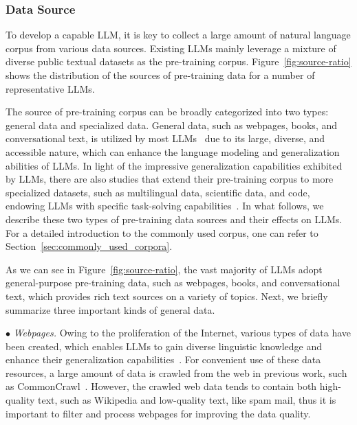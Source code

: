 \subsubsection{Data Source}\label{sec-source}
To develop a capable LLM, it is key to collect a large amount of natural language corpus from various data sources.
Existing LLMs mainly leverage a mixture of diverse public textual datasets as the pre-training corpus. 
Figure~\ref{fig:source-ratio} shows  the distribution of the sources of pre-training data for a number of representative LLMs. 

The source of pre-training corpus can be broadly categorized into two types: general data and specialized data. General data, such as webpages, books, and conversational text, is utilized by most LLMs~\cite{Chowdhery-arxiv-2022-PaLM,Brown-NeurIPS-2020-Language,Zhang-arxiv-2022-OPT} due to its large, diverse, and accessible nature, which can enhance the language modeling and generalization abilities of LLMs. In light of the impressive generalization capabilities exhibited by LLMs, there are also studies that extend their pre-training corpus to more specialized datasets, such as multilingual data, scientific data, and code, endowing LLMs with specific task-solving capabilities~\cite{Chowdhery-arxiv-2022-PaLM,Taylor-arxiv-2022-Galactica, nijkamp-arxiv-2022-Codegen}. In what follows, we describe these two types of pre-training data sources and their effects on LLMs.  {For a detailed introduction to the commonly used corpus, one can refer to Section~\ref{sec:commonly_used_corpora}.} 

As we can see in Figure~\ref{fig:source-ratio}, the vast majority of LLMs adopt general-purpose pre-training data, such as webpages, books, and conversational text, which provides rich text sources on a variety of topics. 
Next, we briefly summarize three important kinds of general data.

$\bullet$ \emph{Webpages.} Owing to the proliferation of the Internet, various types of data have been created, which enables LLMs to gain diverse linguistic knowledge and enhance their generalization capabilities~\cite{radford-blog-2019-language,Raffel-JMLR-2020-Exploring}. For convenient use of these data resources, a large amount of data is crawled from the web in previous work, such as CommonCrawl~\cite{commoncrawl}. However, the crawled web data tends to contain both high-quality text, such as Wikipedia and low-quality text, like spam mail, thus it is important to filter and process webpages for improving the data quality. 

